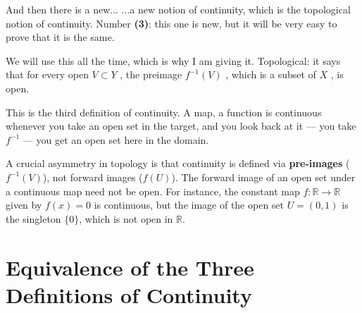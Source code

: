 \begin{speech}[01:06:11 - 01:07:32]
And then there is a new...  ...a new notion of continuity, which is the topological notion of continuity. Number \textbf{(3)}: this one is new, but it will be very easy to prove that it is the same. 

We will use this all the time, which is why I am giving it. Topological:  it says that for every open $V \subset Y$ , the preimage $f^{-1}(V)$ , which is a subset of $X$ , is open. 

This is the third definition of continuity. A map, a function is continuous whenever you take an open set in the target, and you look back at it --- you take $f^{-1}$ --- you get an open set here in the domain.
\end{speech}

\begin{content}

\begin{steps}
A crucial asymmetry in topology is that continuity is defined via \textbf{pre-images} ($f^{-1}(V)$), not forward images ($f(U)$). The forward image of an open set under a continuous map need not be open. For instance, the constant map $f \colon \mathbb{R} \to \mathbb{R}$ given by $f(x) = 0$ is continuous, but the image of the open set $U = (0, 1)$ is the singleton $\{0\}$, which is not open in $\mathbb{R}$.
\end{steps}
\end{content}

\section{Equivalence of the Three Definitions of Continuity}

